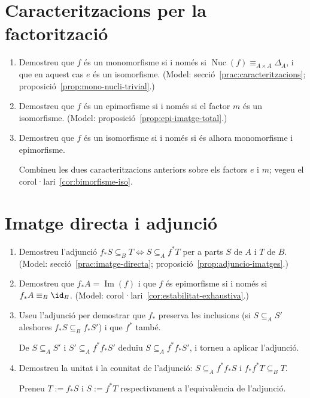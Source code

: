 \section{Caracteritzacions per la factorització}

\begin{enumerate}[resume]
  \item Demostreu que \(f\) és un monomorfisme si i només si \(\operatorname{Nuc}(f)\equiv_{A\times A}\Delta_A\), i que en aquest cas \(e\) és un isomorfisme. (Model: secció~\ref{prac:caracteritzacions}; proposició~\ref{prop:mono-nucli-trivial}.)

  \item Demostreu que \(f\) és un epimorfisme si i només si el factor \(m\) és un isomorfisme. (Model: proposició~\ref{prop:epi-imatge-total}.)

  \item Demostreu que \(f\) és un isomorfisme si i només si és alhora monomorfisme i epimorfisme. \begin{indicacio}Combineu les dues caracteritzacions anteriors sobre els factors \(e\) i \(m\); vegeu el corol·lari~\ref{cor:bimorfisme-iso}.\end{indicacio}
\end{enumerate}

\section{Imatge directa i adjunció}

\begin{enumerate}[resume]
  \item Demostreu l'adjunció \(f_{*}S\subseteq_B T\iff S\subseteq_A f^{*}T\) per a parts \(S\) de \(A\) i \(T\) de \(B\). (Model: secció~\ref{prac:imatge-directa}; proposició~\ref{prop:adjuncio-imatges}.)

  \item Demostreu que \(f_{*}A=\operatorname{Im}(f)\) i que \(f\) és epimorfisme si i només si \(f_{*}A\equiv_B\id_B\). (Model: corol·lari~\ref{cor:estabilitat-exhaustiva}.)

  \item Useu l'adjunció per demostrar que \(f_{*}\) preserva les inclusions (si \(S\subseteq_A S'\) aleshores \(f_{*}S\subseteq_B f_{*}S'\)) i que \(f^{*}\) també. \begin{indicacio}De \(S\subseteq_A S'\) i \(S'\subseteq_A f^{*}f_{*}S'\) deduïu \(S\subseteq_A f^{*}f_{*}S'\), i torneu a aplicar l'adjunció.\end{indicacio}

  \item Demostreu la unitat i la counitat de l'adjunció: \(S\subseteq_A f^{*}f_{*}S\) i \(f_{*}f^{*}T\subseteq_B T\). \begin{indicacio}Preneu \(T:=f_{*}S\) i \(S:=f^{*}T\) respectivament a l'equivalència de l'adjunció.\end{indicacio}
\end{enumerate}

